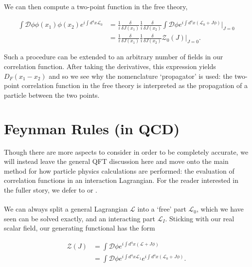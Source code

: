 We can then compute a two-point function in the free theory,

\begin{equation}
\begin{split}
\int \mathcal{D} \phi \phi(x_1) \phi(x_2) e^{i \int d^4 x \mathscr{L}_0}& = \frac{1}{i} \frac{\delta}{\delta J(x_1)}\frac{1}{i} \frac{\delta}{\delta J(x_2)} \int \mathcal{D} \phi e^{i \int d^4x(\mathscr{L}_0 + J \phi)}\biggr\rvert_{J = 0} \\
&=  \frac{1}{i} \frac{\delta}{\delta J(x_1)}\frac{1}{i} \frac{\delta}{\delta J(x_2)} \mathcal{Z}_0(J)\biggr\rvert_{J = 0}.
\end{split}
\end{equation}

Such a procedure can be extended to an arbitrary number of fields in our correlation function. After taking the derivatives, this expression yields $D_F(x_1 - x_2)$ and so we see why the nomenclature `propagator' is used: the two-point correlation function in the free theory is interpreted as the propagation of a particle between the two points.

\section{Feynman Rules (in QCD)}

Though there are more aspects to consider in order to be completely accurate, we will instead leave the general QFT discussion here and move onto the main method for how particle physics calculations are performed: the evaluation of correlation functions in an interaction Lagrangian. For the reader interested in the fuller story, we defer to \cite{Peskin1995} or \cite{Srednicki2007}. \\
\\
We can always split a general Lagrangian $\mathscr{L}$ into a `free' part $\mathscr{L}_0$, which we have seen can be solved exactly, and an interacting part $\mathscr{L}_I$.  Sticking with our real scalar field, our generating functional has the form

\begin{equation}
\begin{split}
\mathcal{Z}(J) &= \int \mathcal{D} \phi e^{i \int d^4 x (\mathscr{L} + J \phi)} \\
&= \int \mathcal{D} \phi e^{i \int d^4 x \mathscr{L}_1} e^{i \int d^4 x (\mathscr{L}_0 + J \phi)}.
\end{split}
\end{equation} 


